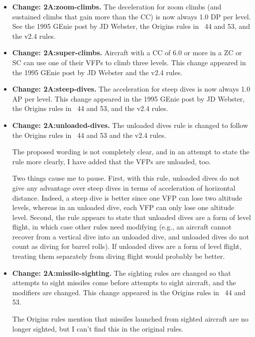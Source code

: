 \documentclass[10pt]{article}
\newcommand{\itemtag}[1]{\item \textbf{Change: #1.}}
\begin{document}
\begin{itemize}
    For aircraft with low and high bleed rates, the sustained turning penalties are 0.5 and 1.5 DP. This change was included in the “Props against Jets” article in {\APJ}~32 and the Origins rules {\APJ}~39, 44, and 53 and the v2.4 rules.

    \itemtag{2A:zoom-climbs} The deceleration for zoom climbs (and sustained climbs that gain more than the CC) is now always 1.0 DP per level. See the 1995 GEnie post by JD Webster, the Origins rules {in \APJ}~44 and 53, and the v2.4 rules.

    \itemtag{2A:super-climbs} Aircraft with a CC of 6.0 or more in a ZC or SC can use one of their VFPs to climb three levels. This change appeared in the 1995 GEnie post by JD Webster and the v2.4 rules.

    \itemtag{2A:steep-dives} The acceleration for steep dives is now always 1.0 AP per level. This change appeared in the 1995 GEnie post by JD Webster, the Origins rules in {\APJ}~44 and 53, and the v2.4 rules.

    \itemtag{2A:unloaded-dives} The unloaded dives rule is changed to follow the Origins rules in {\APJ}~44 and 53 and the v2.4 rules.
    
    The proposed wording is not completely clear, and in an attempt to state the rule more clearly, I have added that the VFPs are unloaded, too. 
    
    Two things cause me to pause. First, with this rule, unloaded dives do not give any advantage over steep dives in terms of acceleration of horizontal distance. Indeed, a steep dive is better since one VFP can lose two altitude levels, whereas in an unloaded dive, each VFP can only lose one altitude level. Second, the rule appears to state that unloaded dives are a form of level flight, in which case other rules need modifying (e.g., an aircraft cannot recover from a vertical dive into an unloaded dive, and unloaded dives do not count as diving for barrel rolls). If unloaded dives are a form of level flight, treating them separately from diving flight would probably be better.

    \itemtag{2A:missile-sighting} The sighting rules are changed so that attempts to sight missiles come before attempts to sight aircraft, and the modifiers are changed. This change appeared in the Origins rules in {\APJ}~44 and 53.
    
    The Origins rules mention that missiles launched from sighted aircraft are no longer sighted, but I can’t find this in the original rules.


\end{itemize}
\end{document}
